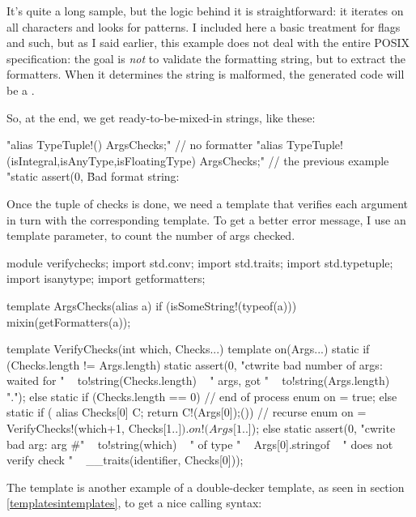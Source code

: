 It's quite a long sample, but the logic behind it is straightforward: it iterates on all characters and looks for  patterns. I included here a basic treatment for flags and such, but as I said earlier, this example does not deal with the entire POSIX specification: the goal is \emph{not} to validate the formatting string, but to extract the formatters. When it determines the string is malformed, the generated code will be a .

So, at the end, we get ready-to-be-mixed-in strings, like these:

\begin{dcode}
"alias TypeTuple!() ArgsChecks;" // no formatter
"alias TypeTuple!(isIntegral,isAnyType,isFloatingType) ArgsChecks;" // the previous example
"static assert(0, \"Bad format string: %
\end{dcode}

Once the tuple of checks is done, we need a template that verifies each argument in turn with the corresponding template. To get a better error message, I use an  template parameter, to count the number of args checked.

\begin{ndcode}
module verifychecks;
import std.conv;
import std.traits;
import std.typetuple;
import isanytype;
import getformatters;

template ArgsChecks(alias a) if (isSomeString!(typeof(a)))
{
    mixin(getFormatters(a));
}

template VerifyChecks(int which, Checks...)
{
    template on(Args...)
    {
        static if (Checks.length != Args.length)
            static assert(0, "ctwrite bad number of args: waited for " ~ to!string(Checks.length) 
                           ~ " args, got " ~ to!string(Args.length) ~ ".");
        else static if (Checks.length == 0) // end of process
            enum on = true;
        else static if ({ alias Checks[0] C; return C!(Args[0]);}()) // recurse
            enum on = VerifyChecks!(which+1, Checks[1..$]).on!(Args[1..$]);
        else
            static assert(0, "cwrite bad arg: arg #" ~ to!string(which) 
                           ~ " of type " ~ Args[0].stringof 
                           ~ " does not verify check " ~ __traits(identifier, Checks[0]));
    }
}
\end{ndcode}

The  template is another example of a double-decker template, as seen in section \ref{templatesintemplates}, to get a nice calling syntax:

